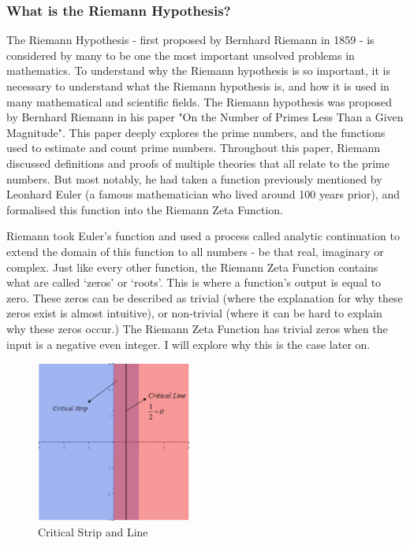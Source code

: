 \documentclass{article}
\begin{document}
\subsubsection{What is the Riemann Hypothesis?}

The Riemann Hypothesis - first proposed by Bernhard Riemann in 1859 - is considered by many to be one the most important unsolved problems in mathematics. To understand why the Riemann hypothesis is so important, it is necessary to understand what the Riemann hypothesis is, and how it is used in many mathematical and scientific fields.
The Riemann hypothesis was proposed by Bernhard Riemann in his paper "On the Number of Primes Less Than a Given Magnitude". This paper deeply explores the prime numbers, and the functions used to estimate and count prime numbers. Throughout this paper, Riemann discussed definitions and proofs of multiple theories that all relate to the prime numbers. But most notably, he had taken a function previously mentioned by Leonhard Euler (a famous mathematician who lived around 100 years prior), and formalised this function into the Riemann Zeta Function.


Riemann took Euler’s function and used a process called analytic continuation to extend the domain of this function to all numbers - be that real, imaginary or complex. Just like every other function, the Riemann Zeta Function contains what are called ‘zeros’ or ‘roots’. This is where a function’s output is equal to zero. These zeros can be described as trivial (where the explanation for why these zeros exist is almost intuitive), or non-trivial (where it can be hard to explain why these zeros occur.) The Riemann Zeta Function has trivial zeros when the input is a negative even integer. I will explore why this is the case later on.

\begin{figure}
    \centering
    \includegraphics[width=2.0in]{critical-strip}
    \caption{Critical Strip and Line}
\end{figure}
\end{document}
